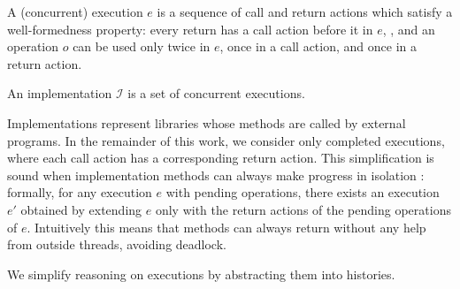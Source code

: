 \begin{definition}\label{def:concurrent execution}
A (concurrent) execution $e$ is a sequence of call and return actions which satisfy a well-formedness property: every return has a call action before it in $e$, , and an operation $o$ can be used only twice in $e$, once in a call action, and once in a return action.
\end{definition}

\begin{example}\label{example:concurrent execution}
\end{example}

\begin{definition}\label{def:implementation}
An implementation $\mathcal{I}$ is a set of concurrent executions.
\end{definition}

Implementations represent libraries whose methods are called by external programs. In the remainder of this work, we consider only completed executions, where each call action has a corresponding return action. This simplification is sound when implementation methods can always make progress in isolation \cite{Henzinger:2013}: formally, for any execution $e$ with pending operations, there exists an execution $e'$ obtained by extending $e$ only with the return actions of the pending operations of $e$. Intuitively this means that methods can always return without any help from outside threads, avoiding deadlock.

We simplify reasoning on executions by abstracting them into histories.

\begin{definition}\label{def:histories}
\end{definition}

